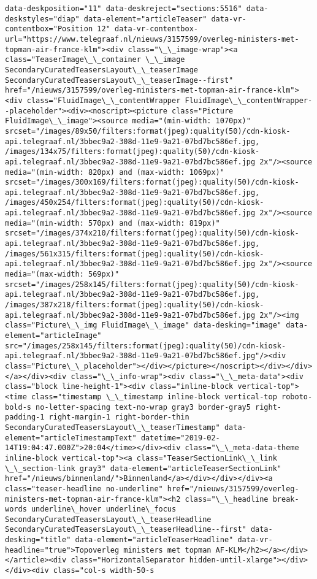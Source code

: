 \documentclass[11pt]{article}
\begin{document}
\begin{Verbatim}[commandchars=\\\{\}]
data-deskposition="11" data-deskreject="sections:5516" data-deskstyles="diap" data-element="articleTeaser" data-vr-contentbox="Position 12" data-vr-contentbox-url="https://www.telegraaf.nl/nieuws/3157599/overleg-ministers-met-topman-air-france-klm"><div class="\_\_image-wrap"><a class="TeaserImage\_\_container \_\_image SecondaryCuratedTeasersLayout\_\_teaserImage SecondaryCuratedTeasersLayout\_\_teaserImage--first" href="/nieuws/3157599/overleg-ministers-met-topman-air-france-klm"><div class="FluidImage\_\_contentWrapper FluidImage\_\_contentWrapper--placeholder"><div><noscript><picture class="Picture FluidImage\_\_image"><source media="(min-width: 1070px)" srcset="/images/89x50/filters:format(jpeg):quality(50)/cdn-kiosk-api.telegraaf.nl/3bbec9a2-308d-11e9-9a21-07bd7bc586ef.jpg, /images/134x75/filters:format(jpeg):quality(50)/cdn-kiosk-api.telegraaf.nl/3bbec9a2-308d-11e9-9a21-07bd7bc586ef.jpg 2x"/><source media="(min-width: 820px) and (max-width: 1069px)" srcset="/images/300x169/filters:format(jpeg):quality(50)/cdn-kiosk-api.telegraaf.nl/3bbec9a2-308d-11e9-9a21-07bd7bc586ef.jpg, /images/450x254/filters:format(jpeg):quality(50)/cdn-kiosk-api.telegraaf.nl/3bbec9a2-308d-11e9-9a21-07bd7bc586ef.jpg 2x"/><source media="(min-width: 570px) and (max-width: 819px)" srcset="/images/374x210/filters:format(jpeg):quality(50)/cdn-kiosk-api.telegraaf.nl/3bbec9a2-308d-11e9-9a21-07bd7bc586ef.jpg, /images/561x315/filters:format(jpeg):quality(50)/cdn-kiosk-api.telegraaf.nl/3bbec9a2-308d-11e9-9a21-07bd7bc586ef.jpg 2x"/><source media="(max-width: 569px)" srcset="/images/258x145/filters:format(jpeg):quality(50)/cdn-kiosk-api.telegraaf.nl/3bbec9a2-308d-11e9-9a21-07bd7bc586ef.jpg, /images/387x218/filters:format(jpeg):quality(50)/cdn-kiosk-api.telegraaf.nl/3bbec9a2-308d-11e9-9a21-07bd7bc586ef.jpg 2x"/><img class="Picture\_\_img FluidImage\_\_image" data-desking="image" data-element="articleImage" src="/images/258x145/filters:format(jpeg):quality(50)/cdn-kiosk-api.telegraaf.nl/3bbec9a2-308d-11e9-9a21-07bd7bc586ef.jpg"/><div class="Picture\_\_placeholder"></div></picture></noscript></div></div></a></div><div class="\_\_info-wrap"><div class="\_\_meta-data"><div class="block line-height-1"><div class="inline-block vertical-top"><time class="timestamp \_\_timestamp inline-block vertical-top roboto-bold-s no-letter-spacing text-no-wrap gray3 border-gray5 right-padding-1 right-margin-1 right-border-thin SecondaryCuratedTeasersLayout\_\_teaserTimestamp" data-element="articleTimestampText" datetime="2019-02-14T19:04:47.000Z">20:04</time></div><div class="\_\_meta-data-theme inline-block vertical-top"><a class="TeaserSectionLink\_\_link \_\_section-link gray3" data-element="articleTeaserSectionLink" href="/nieuws/binnenland/">Binnenland</a></div></div></div><a class="teaser-headline no-underline" href="/nieuws/3157599/overleg-ministers-met-topman-air-france-klm"><h2 class="\_\_headline break-words underline\_hover underline\_focus SecondaryCuratedTeasersLayout\_\_teaserHeadline SecondaryCuratedTeasersLayout\_\_teaserHeadline--first" data-desking="title" data-element="articleTeaserHeadline" data-vr-headline="true">Topoverleg ministers met topman AF-KLM</h2></a></div></article><div class="HorizontalSeparator hidden-until-xlarge"></div></div><div class="col-s width-50-s 
\end{Verbatim}
\end{document}
